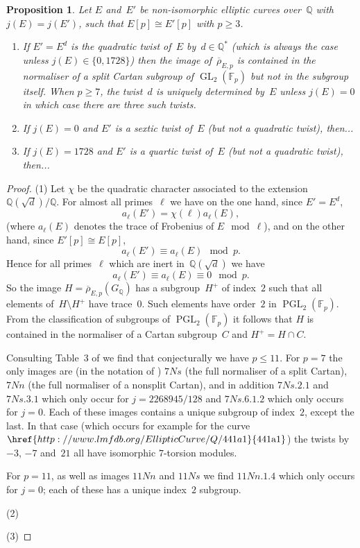 \documentclass[12pt]{amsart}
\newcommand{\lmfdbec}[3]{\href{http://www.lmfdb.org/EllipticCurve/Q/#1#2#3}{{\text{\rm#1#2#3}}}}
\newcommand{\F}{\mathbb{F}}
\newcommand{\Q}{\mathbb{Q}}
\newcommand{\rhobar}{{\overline{\rho}}}
\newcommand{\GL}{\operatorname{GL}}
\newcommand{\PGL}{\operatorname{PGL}}
\numberwithin{equation}{section}
\newtheorem{proposition}[theorem]{Proposition}
\theoremstyle{definition}
\theoremstyle{remark}
\begin{document}
\begin{proposition}\label{P:twist}
Let $E$ and~$E'$ be non-isomorphic elliptic curves over~$\Q$ with
$j(E)=j(E')$, such that $E[p]\cong E'[p]$ with $p\ge3$.
\begin{enumerate}
  \item If $E'=E^d$ is the quadratic twist of~$E$ by~$d\in\Q^*$ (which
    is always the case unless $j(E)\in\{0,1728\}$) then the image
    of~$\rhobar_{E,p}$ is contained in the normaliser of a split
    Cartan subgroup of $\GL_2(\F_p)$ but not in the subgroup itself.
    When $p\ge7$, the twist~$d$ is uniquely determined by~$E$ unless
    $j(E)=0$ in which case there are three such twists.
   \item If $j(E)=0$ and $E'$ is a sextic twist of~$E$ (but not a
     quadratic twist), then...
   \item If $j(E)=1728$ and $E'$ is a quartic twist of~$E$ (but not a
     quadratic twist), then...
\end{enumerate}
\end{proposition}
\begin{proof}
(1) Let $\chi$ be the quadratic character associated to the
  extension $\Q(\sqrt{d})/\Q$.  For almost all primes~$\ell$ we have
  on the one hand, since $E'=E^d$,
  \[
  a_\ell(E') = \chi(\ell) a_\ell(E),
  \]
  (where $a_\ell(E)$ denotes the trace of Frobenius of $E\mod\ell$),
  and on the other hand, since $E'[p]\cong E[p]$,
  \[
  a_\ell(E') \equiv a_\ell(E) \mod{p}.
  \]
  Hence for all primes~$\ell$ which are inert in~$\Q(\sqrt{d})$ we have
  \[
  a_\ell(E') \equiv a_\ell(E) \equiv0 \mod{p}.
  \]
  So the image $H=\rhobar_{E,p}(G_\Q)$ has a subgroup~$H^+$ of
  index~$2$ such that all elements of~$H\setminus H^+$ have trace~$0$.
  Such elements have order~$2$ in $\PGL_2(\F_p)$.  From the
  classification of subgroups of $\PGL_2(\F_p)$ it follows that $H$ is
  contained in the normaliser of a Cartan subgroup~$C$ and $H^+=H\cap
  C$.

Consulting Table~3 of \cite{Sutherland} we find that conjecturally we
have $p\le11$.  For $p=7$ the only images are (in the notation of
\cite{Sutherland}) $7Ns$ (the full normaliser of a split Cartan),
$7Nn$ (the full normaliser of a nonsplit Cartan), and in addition
$7Ns.2.1$ and $7Ns.3.1$ which only occur for $j=2268945/128$ and
$7Ns.6.1.2$ which only occurs for $j=0$.  Each of these images
contains a unique subgroup of index~$2$, except the last.  In that
case (which occurs for example for the curve $\lmfdbec{441}{a}{1}$)
the twists by $-3$, $-7$ and~$21$ all have isomorphic $7$-torsion
modules.

For $p=11$, as well as images $11Nn$ and $11Ns$ we find $11Nn.1.4$
which only occurs for $j=0$; each of these has a unique index~$2$
subgroup.

  (2)

  (3)

\end{proof}
\end{document}
